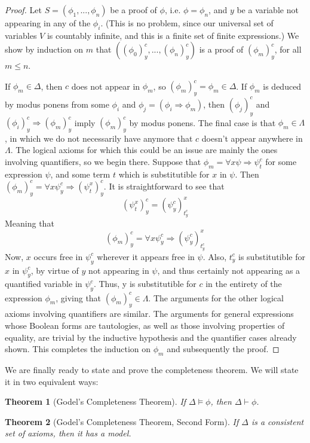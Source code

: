 \documentclass{article}
\theoremstyle{definition}
\theoremstyle{plain}
\theoremstyle{theorem}
\newtheorem{theorem}{Theorem}[section]
\begin{document}
\begin{proof}
    Let $S = (\phi_1,...,\phi_n)$ be a proof of $\phi$, i.e. $\phi = \phi_n$, and $y$ be a variable not appearing in any of the $\phi_i$. (This is no problem, since our universal set of variables $V$ is countably infinite, and this is a finite set of finite expressions.) We show by induction on $m$ that $((\phi_0)_y^c,...,(\phi_n)_y^c)$ is a proof of $(\phi_m)_y^c$, for all $m \leq n$.
    \par If $\phi_m \in \Delta$, then $c$ does not appear in $\phi_m$, so $(\phi_m)_y^c = \phi_m \in \Delta$. If $\phi_m$ is deduced by modus ponens from some $\phi_i$ and $\phi_j = (\phi_i \Rightarrow \phi_m)$, then $(\phi_j)_y^c$ and $(\phi_i)_y^c \Rightarrow (\phi_m)_y^c$ imply $(\phi_m)_y^c$ by modus ponens. The final case is that $\phi_m \in \Lambda$, in which we do not necessarily have anymore that $c$ doesn't appear anywhere in $\Lambda$. The logical axioms for which this could be an issue are mainly the ones involving quantifiers, so we begin there. Suppose that $\phi_m = \forall x \psi \Rightarrow \psi_t^c$ for some expression $\psi$, and some term $t$ which is substitutible for $x$ in $\psi$. Then $(\phi_m)_y^c = \forall x \psi_y^c \Rightarrow (\psi_t^x)_y^c$. It is straightforward to see that 
    \[ (\psi_t^x)_y^c = (\psi_y^c)_{t_y^c}^x \]
    Meaning that
    \[ (\phi_m)_y^c = \forall x \psi_y^c \Rightarrow (\psi_y^c)_{t_y^c}^x \]
    Now, $x$ occurs free in $\psi_y^c$ wherever it appears free in $\psi$. Also, $t_y^c$ is substitutible for $x$ in $\psi_y^c$, by virtue of $y$ not appearing in $\psi$, and thus certainly not appearing as a quantified variable in $\psi_y^c$. Thus, y is substitutible for $c$ in the entirety of the expression $\phi_m$, giving that $(\phi_m)_y^c \in \Lambda$. The arguments for the other logical axioms involving quantifiers are similar. The arguments for general expressions whose Boolean forms are tautologies, as well as those involving properties of equality, are trivial by the inductive hypothesis and the quantifier cases already shown. This completes the induction on $\phi_m$ and subsequently the proof.
\end{proof}
We are finally ready to state and prove the completeness theorem. We will state it in two equivalent ways:
\begin{theorem}[Godel's Completeness Theorem]
    If $\Delta \models \phi$, then $\Delta \vdash \phi$.
\end{theorem}
\begin{theorem}[Godel's Completeness Theorem, Second Form]
    If $\Delta$ is a consistent set of axioms, then it has a model.
\end{theorem}
\end{document}
